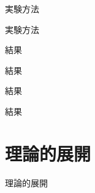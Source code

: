 \begin{frame}{実験方法}

\end{frame}

\begin{frame}{実験方法}

\end{frame}

\begin{frame}{結果}

\end{frame}

\begin{frame}{結果}

\end{frame}

\begin{frame}{結果}

\end{frame}

\begin{frame}{結果}

\end{frame}

\section{理論的展開}

\begin{frame}{理論的展開}

\end{frame}







